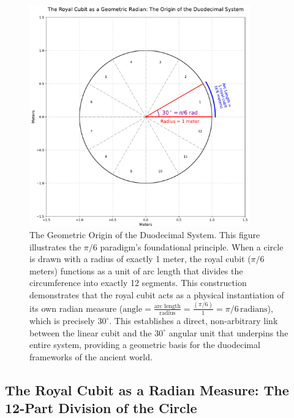 \documentclass[11pt]{article}
\begin{document}
\begin{figure}[htbp]
\centering
\includegraphics[width=0.85\textwidth]{figures/radian.pdf}
\caption{The Geometric Origin of the Duodecimal System. This figure illustrates the $\pi/6$ paradigm's foundational principle. When a circle is drawn with a radius of exactly 1 meter, the royal cubit ($\pi/6$ meters) functions as a unit of arc length that divides the circumference into exactly 12 segments. This construction demonstrates that the royal cubit acts as a physical instantiation of its own radian measure ($\text{angle} = \frac{\text{arc length}}{\text{radius}} = \frac{(\pi/6)}{1} = \pi/6\,\text{radians}$), which is precisely $30^\circ$. This establishes a direct, non-arbitrary link between the linear cubit and the $30^\circ$ angular unit that underpins the entire system, providing a geometric basis for the duodecimal frameworks of the ancient world.}
\label{fig:radian_origin}
\end{figure}

\subsection{The Royal Cubit as a Radian Measure: The 12-Part Division of the Circle}
\end{document}
